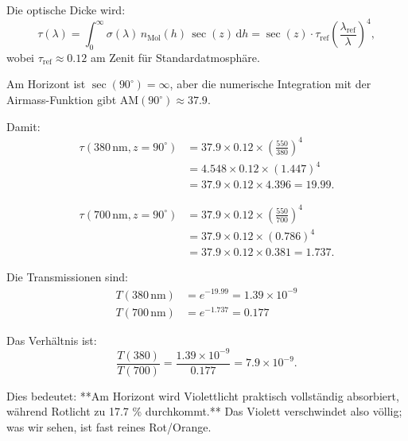 \documentclass[12pt,a4paper]{article}
\begin{document}
Die optische Dicke wird:
\begin{equation}
	\tau(\lambda) = \int_0^\infty \sigma(\lambda) \, n_{\mathrm{Mol}}(h) \, \sec(z) \, \mathrm{d}h
	= \sec(z) \cdot \tau_{\mathrm{ref}} \left(\frac{\lambda_{\mathrm{ref}}}{\lambda}\right)^4,
	\label{eq:tau_lambda}
\end{equation}
wobei $\tau_{\mathrm{ref}} \approx 0.12$ am Zenit für Standardatmosphäre.

Am Horizont ist $\sec(90^\circ) = \infty$, aber die numerische Integration mit
der Airmass-Funktion gibt $\mathrm{AM}(90^\circ) \approx 37.9$.

Damit:
\begin{equation}
  \begin{aligned}
  \tau(380\,\mathrm{nm}, z=90^\circ)
  &= 37.9 \times 0.12 \times \left(\frac{550}{380}\right)^4 \\
  &= 4.548 \times 0.12 \times (1.447)^4 \\
  &= 37.9 \times 0.12 \times 4.396 = 19.99.
  \end{aligned}
	\label{eq:tau_380}
\end{equation}

\begin{equation}
  \begin{aligned}
  \tau(700\,\mathrm{nm}, z=90^\circ)
  &= 37.9 \times 0.12 \times \left(\frac{550}{700}\right)^4 \\
  &= 37.9 \times 0.12 \times (0.786)^4 \\
  &= 37.9 \times 0.12 \times 0.381 = 1.737.
  \end{aligned}
	\label{eq:tau_700}
\end{equation}

Die Transmissionen sind:
\begin{equation}
	\begin{aligned}
		T(380\,\mathrm{nm}) &= e^{-19.99} = 1.39 \times 10^{-9}\\
		T(700\,\mathrm{nm}) &= e^{-1.737} = 0.177
	\end{aligned}
	\label{eq:T_concrete}
\end{equation}

Das Verhältnis ist:
\begin{equation}
	\frac{T(380)}{T(700)} = \frac{1.39 \times 10^{-9}}{0.177} = 7.9 \times 10^{-9}.
	\label{eq:T_ratio_concrete}
\end{equation}

Dies bedeutet: **Am Horizont wird Violettlicht praktisch vollständig absorbiert,
während Rotlicht zu 17.7 \% durchkommt.** Das Violett verschwindet also
völlig; was wir sehen, ist fast reines Rot/Orange.
\end{document}
